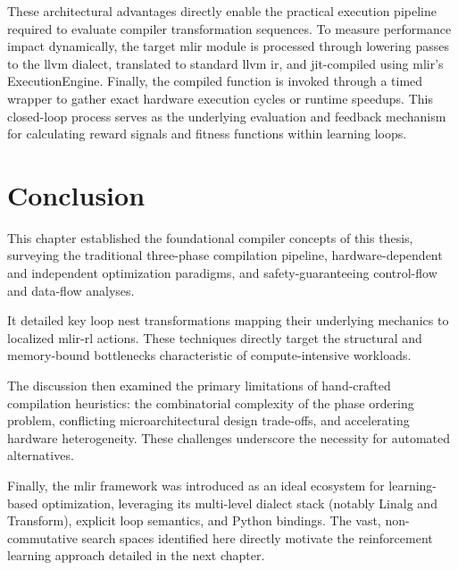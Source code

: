 These architectural advantages directly enable the practical execution pipeline required to evaluate compiler transformation sequences. To measure performance impact dynamically, the target \gls{mlir} module is processed through lowering passes to the \gls{llvm} dialect, translated to standard \gls{llvm} \gls{ir}, and \gls{jit}-compiled using \gls{mlir}'s ExecutionEngine. Finally, the compiled function is invoked through a timed wrapper to gather exact hardware execution cycles or runtime speedups. This closed-loop process serves as the underlying evaluation and feedback mechanism for calculating reward signals and fitness functions within learning loops.
\section{Conclusion}

This chapter established the foundational compiler concepts of this thesis, surveying the traditional three-phase compilation pipeline, hardware-dependent and independent optimization paradigms, and safety-guaranteeing control-flow and data-flow analyses.

It detailed key loop nest transformations mapping their underlying mechanics to localized \gls{mlir}-\gls{rl} actions. These techniques directly target the structural and memory-bound bottlenecks characteristic of compute-intensive workloads.

The discussion then examined the primary limitations of hand-crafted compilation heuristics: the combinatorial complexity of the phase ordering problem, conflicting microarchitectural design trade-offs, and accelerating hardware heterogeneity. These challenges underscore the necessity for automated alternatives.

Finally, the \gls{mlir} framework was introduced as an ideal ecosystem for learning-based optimization, leveraging its multi-level dialect stack (notably Linalg and Transform), explicit loop semantics, and Python bindings. The vast, non-commutative search spaces identified here directly motivate the reinforcement learning approach detailed in the next chapter.
